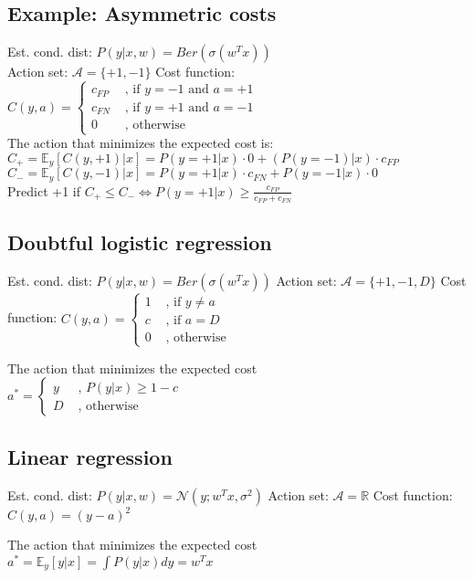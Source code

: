 \subsection*{Example: Asymmetric costs}
	 Est. cond. dist: $P(y|x,w) = Ber(\sigma(w^Tx))$\\
	 Action set: $\mathcal{A} = \{ +1, -1\}$
	 Cost function: \\ $C(y,a) = \begin{cases}
			c_{FP} &\text{ , if $y=-1$ and $a=+1$}\\
			c_{FN} &\text{ , if $y=+1$ and $a=-1$}\\
			0 &\text{ , otherwise}
			\end{cases}
		$\\
The action that minimizes the expected cost is:\\
$C_+ = \mathbb{E}_y[C(y,+1)|x] = P(y=+1|x) \cdot 0 + (P(y=-1)|x) \cdot c_{FP}$\\
$C_- = \mathbb{E}_y[C(y,-1)|x] = P(y=+1|x) \cdot c_{FN} + P(y=-1|x) \cdot 0$\\
Predict +1 if $C_+ \leq C_- \Leftrightarrow P(y=+1|x) \geq \frac{c_{FP}}{c_{FP} + c_{FN}}$

\subsection*{Doubtful logistic regression}
\begin{itemize}
	 Est. cond. dist: $P(y|x,w) = Ber(\sigma(w^Tx))$
	 Action set: $\mathcal{A} = \{ +1, -1, D\}$
	 Cost function: $C(y,a) =\begin{cases} 
			1 &\text{ , if } y \not = a\\
			c &\text{ , if } a = D\\
			0 &\text{ , otherwise} 
		\end{cases}
		$
\end{itemize}
The action that minimizes the expected cost\\
$a^* = \begin{cases}
		y &\text{ , $P(y|x) \geq 1-c$}\\
		D &\text{ , otherwise}
	\end{cases}
$

\subsection*{Linear regression}
\begin{itemize}
	 Est. cond. dist: $P(y|x,w) = \mathcal{N}(y;w^Tx, \sigma^2)$
	 Action set: $\mathcal{A} = \mathbb{R}$
	 Cost function: $C(y,a) = (y-a)^2$
\end{itemize}
The action that minimizes the expected cost\\
$a^* = \mathbb{E}_y[y|x] = \int P(y | x) dy = w^Tx$

